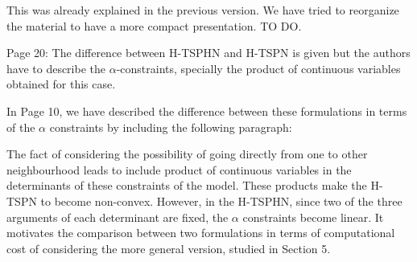 \documentclass{article}
\newenvironment{reviewer}{\setcounter{pointcounter}{1}}{}
\newcommand{\point}{\text{{\selectfont \thepointcounter} \stepcounter{pointcounter}}}
\begin{document}
\begin{reviewer}
		\begin{tcolorbox}[breakable,enhanced,coltitle=black,colback=red!5!white,colframe=red!75!black,title=\textbf{Answer R1.\point},borderline={1pt}{0pt}{black},boxrule=0pt]
	This was already explained in the previous version. We have tried to reorganize the material to have a more compact presentation. TO DO.
		\end{tcolorbox}
		
		\begin{itshape}
			Page 20: The difference between H-TSPHN and H-TSPN is given but the authors have to describe the $\alpha$-constraints, specially the product of continuous variables obtained for this case.
		\end{itshape}
		
		\begin{tcolorbox}[breakable,enhanced,coltitle=black,colback=red!5!white,colframe=red!75!black,title=\textbf{Answer R1.\point},borderline={1pt}{0pt}{black},boxrule=0pt]
		In Page 10, we have described the difference between these formulations in terms of the $\alpha$ constraints by including the following paragraph:
		
		\medskip
		
		The fact of considering the possibility of going directly from one to other neighbourhood leads to include product of continuous variables in the determinants of these constraints of the model. These products make the H-TSPN to become non-convex. However, in the H-TSPHN, since two of the three arguments of each determinant are fixed, the $\alpha$ constraints become linear. It motivates the comparison between two formulations in terms of computational cost of considering the more general version, studied in Section 5.
		\end{tcolorbox}
		

\end{reviewer}
\end{document}

